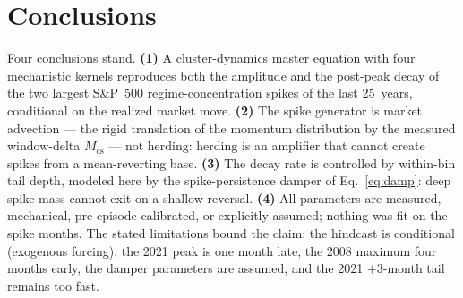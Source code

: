 \documentclass[11pt,a4paper]{article}
\begin{document}
\section{Conclusions}
Four conclusions stand.  \textbf{(1)} A cluster-dynamics master equation
with four mechanistic kernels reproduces both the amplitude and the
post-peak decay of the two largest S\&P~500 regime-concentration spikes
of the last 25~years, conditional on the realized market move.
\textbf{(2)} The spike generator is market advection --- the rigid
translation of the momentum distribution by the measured window-delta
$M_{\mathrm{cs}}$ --- not herding: herding is an amplifier that cannot
create spikes from a mean-reverting base.  \textbf{(3)} The decay rate is
controlled by within-bin tail depth, modeled here by the
spike-persistence damper of Eq.~\eqref{eq:damp}: deep spike mass cannot
exit on a shallow reversal.  \textbf{(4)} All parameters are measured,
mechanical, pre-episode calibrated, or explicitly assumed; nothing was
fit on the spike months.  The stated limitations bound the claim: the
hindcast is conditional (exogenous forcing), the 2021 peak is one month
late, the 2008 maximum four months early, the damper parameters are
assumed, and the 2021 $+3$-month tail remains too fast.

\end{document}
